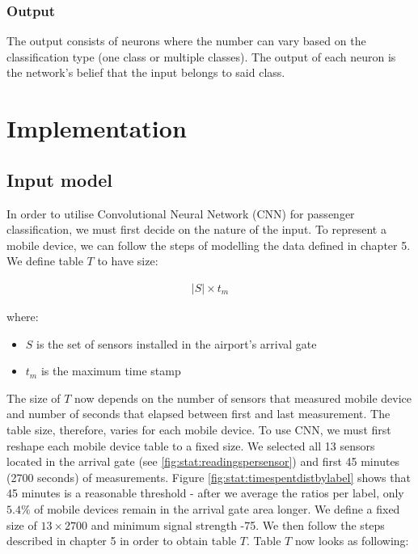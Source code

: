 \subsubsection{Output}
\par 
The output consists of neurons where the number can vary based on the classification type (one class or multiple classes). The output of each neuron is the network's belief that the input belongs to said class. %

\pagebreak
\section{Implementation}
\subsection{Input model}

\par
In order to utilise Convolutional Neural Network (CNN) for passenger classification, we must first decide on the nature of the input. To represent a mobile device, we can follow the steps of modelling the data defined in chapter 5. We define table $T$ to have size:

\begin{align*}
    |S| \times t_m
\end{align*}

\par
where:
\begin{itemize}
	\item $S$ is the set of sensors installed in the airport’s arrival gate
	\item $t_m$ is the maximum time stamp
\end{itemize}

\par
The size of $T$ now depends on the number of sensors that measured mobile device and number of seconds that elapsed between first and last measurement. The table size, therefore, varies for each mobile device. To use CNN, we must first reshape each mobile device table to a fixed size. We selected all 13 sensors located in the arrival gate (see \cref{fig:stat:readingspersensor}) and first 45 minutes (2700 seconds) of measurements. Figure \ref{fig:stat:timespentdistbylabel} shows that 45 minutes is a reasonable threshold - after we average the ratios per label, only $5.4\%$ of mobile devices remain in the arrival gate area longer. We define a fixed size of $13 \times 2700$ and minimum signal strength -75. We then follow the steps described in chapter 5 in order to obtain table $T$. Table $T$ now looks as following:

